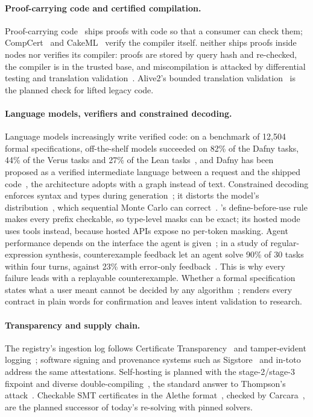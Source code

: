 \paragraph{Proof-carrying code and certified compilation.}
Proof-carrying code~\cite{necula1997pcc} ships proofs with code so that a consumer can check
them; CompCert~\cite{leroy2009formal} and CakeML~\cite{kumar2014cakeml} verify the compiler
itself. \VG{} neither ships proofs inside nodes nor verifies its compiler: proofs are stored by
query hash and re-checked, the compiler is in the trusted base, and miscompilation is attacked by
differential testing and translation validation~\cite{pnueli1998translation}. Alive2's bounded
translation validation~\cite{lopes2021alive2} is the planned check for lifted legacy code.

\paragraph{Language models, verifiers and constrained decoding.}
Language models increasingly write verified code: on a benchmark of 12,504 formal
specifications, off-the-shelf models succeeded on 82\% of the Dafny tasks, 44\% of the Verus
tasks and 27\% of the Lean tasks~\cite{bursuc2025vericoding},
and Dafny has been proposed as a verified intermediate language between a request and the
shipped code~\cite{li2025dafny}, the architecture \VG{} adopts with a graph instead of text.
Constrained decoding enforces syntax and types during generation~\cite{poesia2022synchromesh,
mundler2025type}; it distorts the model's distribution~\cite{park2024grammar}, which sequential
Monte Carlo can correct~\cite{loula2025syntactic}. \VG's define-before-use rule makes every
prefix checkable, so type-level masks can be exact; its hosted mode uses tools instead, because
hosted APIs expose no per-token masking. Agent performance depends on the interface the agent
is given~\cite{yang2024sweagent}; in a study of regular-expression synthesis, counterexample
feedback let an agent solve 90\% of 30 tasks within four turns, against 23\% with error-only
feedback~\cite{badrinarayan2026counterexamples}. This is why every \VG{} failure leads with a
replayable counterexample. Whether a formal specification
states what a user meant cannot be decided by any algorithm~\cite{lahiri2024evaluating}; \VG{}
renders every contract in plain words for confirmation and leaves intent validation to research.

\paragraph{Transparency and supply chain.}
The registry's ingestion log follows Certificate Transparency~\cite{rfc6962} and tamper-evident
logging~\cite{crosby2009efficient}; software signing and provenance systems such as
Sigstore~\cite{newman2022sigstore} and in-toto~\cite{torresarias2019intoto} address the same
attestations. Self-hosting is planned with the stage-2/stage-3 fixpoint and diverse
double-compiling~\cite{wheeler2005countering}, the standard answer to Thompson's
attack~\cite{thompson1984reflections}. Checkable SMT certificates in the Alethe
format~\cite{schurr2021alethe}, checked by Carcara~\cite{andreotti2023carcara}, are the planned
successor of today's re-solving with pinned solvers.
